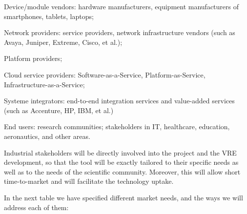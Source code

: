 \begin{compactenum}
\item Device/module vendors: hardware manufacturers, equipment
manufacturers of smartphones, tablets, laptops;
\item Network providers: service providers, network infrastructure
vendors (such as Avaya, Juniper, Extreme, Cisco, et al.);
\item Platform providers;
\item Cloud service providers: Software-as-a-Service,
Platform-as-Service, Infrastructure-as-a-Service;
\item Systeme integrators: end-to-end integration services and
value-added services (such as Accenture, HP, IBM, et al.)
\item End users: research communities; stakeholders in IT, healthcare, 
education, aeronautics, and other areas.
\end{compactenum}
Industrial stakeholders will be directly involved into the project and
the VRE development, so that the tool will be exactly tailored to their
specific needs as well as to the needs of the scientific community.
Moreover, this will allow short time-to-market and will facilitate
the technology uptake.

In the next table we have specified different market needs, and the
ways we will address each of them:


